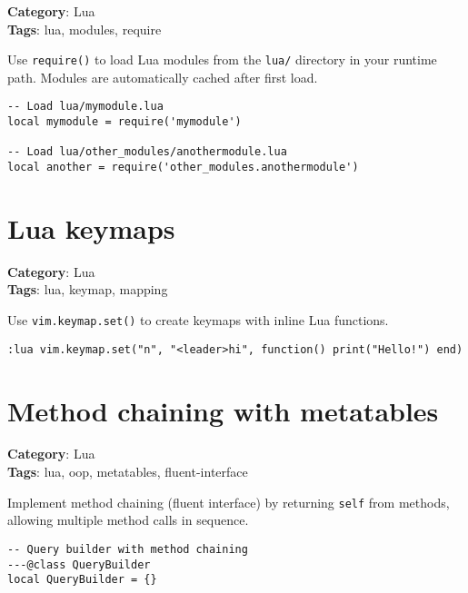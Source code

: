 {{{{{{\textbf{Category}: Lua\\ \textbf{Tags}: lua, modules, require
\vspace{0.5cm}

Use {\footnotesize \Verb§require()§} to load Lua modules from the {\footnotesize \Verb§lua/§} directory in your runtime path. Modules are automatically cached after first load.

\begin{Exa*}{}
\begin{Verbatim}[fontsize=\footnotesize, breaklines, breakanywhere]
-- Load lua/mymodule.lua
local mymodule = require('mymodule')

-- Load lua/other_modules/anothermodule.lua
local another = require('other_modules.anothermodule')
\end{Verbatim}
\end{Exa*}

\section{Lua keymaps}

\textbf{Category}: Lua\\ \textbf{Tags}: lua, keymap, mapping
\vspace{0.5cm}

Use {\footnotesize \Verb§vim.keymap.set()§} to create keymaps with inline Lua functions.

\begin{Exa*}{}
\begin{Verbatim}[fontsize=\footnotesize, breaklines, breakanywhere]
:lua vim.keymap.set("n", "<leader>hi", function() print("Hello!") end)
\end{Verbatim}
\end{Exa*}

\section{Method chaining with metatables}

\textbf{Category}: Lua\\ \textbf{Tags}: lua, oop, metatables, fluent-interface
\vspace{0.5cm}

Implement method chaining (fluent interface) by returning {\footnotesize \Verb§self§} from methods, allowing multiple method calls in sequence.

\begin{Exa*}{}
\begin{Verbatim}[fontsize=\footnotesize, breaklines, breakanywhere]
-- Query builder with method chaining
---@class QueryBuilder
local QueryBuilder = {}


\end{Verbatim}
\end{Exa*}}}}}}}
